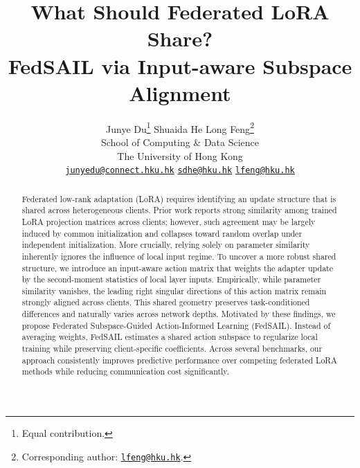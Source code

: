 \documentclass[11pt,letterpaper]{article}
\title{\LARGE\bfseries What Should Federated LoRA Share? \\
FedSAIL via Input-aware Subspace Alignment}
\author{%
    Junye Du\thanks{Equal contribution.}\quad
    Shuaida He\footnotemark[1]\quad
    Long Feng\thanks{Corresponding author: \href{mailto:lfeng@hku.hk}{\texttt{lfeng@hku.hk}}.}\\[0.6em]
    {\normalsize School of Computing \& Data Science}\\
    {\normalsize The University of Hong Kong}\\[0.4em]
    {\small\href{mailto:junyedu@connect.hku.hk}{\texttt{junyedu@connect.hku.hk}}\quad
    \href{mailto:sdhe@hku.hk}{\texttt{sdhe@hku.hk}}\quad
    \href{mailto:lfeng@hku.hk}{\texttt{lfeng@hku.hk}}}%
}
\date{}
\begin{document}
\maketitle

\begin{abstract}
Federated low-rank adaptation (LoRA) requires identifying an update structure that is shared across heterogeneous clients. Prior work reports strong similarity among trained LoRA projection matrices across clients; however, such agreement may be largely induced by common initialization and collapses toward random overlap under independent initialization. 
More crucially, relying solely on parameter similarity inherently ignores the influence of local input regime.
To uncover a more robust shared structure, we introduce an input-aware action matrix that weights the adapter update by the second-moment statistics of local layer inputs. Empirically, while parameter similarity vanishes, the leading right singular directions of this action matrix remain strongly aligned across clients. This shared geometry preserves task-conditioned differences and naturally varies across network depths.
Motivated by these findings, we propose Federated Subspace-Guided Action-Informed Learning (FedSAIL). Instead of averaging weights, FedSAIL estimates a shared action subspace to regularize local training while preserving client-specific coefficients.
Across several benchmarks, our approach consistently improves predictive performance over competing federated LoRA methods while reducing communication cost significantly.
\end{abstract}
\end{document}
